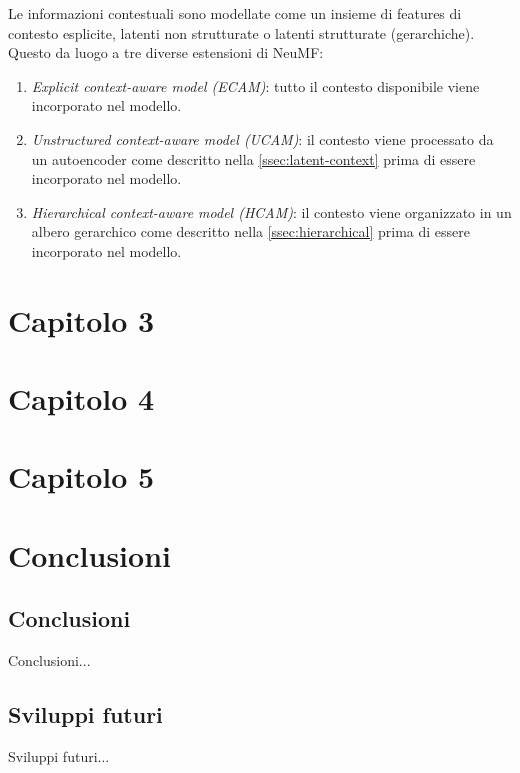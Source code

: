 \documentclass[12pt,italian]{report}
\begin{document}
Le informazioni contestuali sono modellate come un insieme di features di contesto esplicite, latenti non strutturate o latenti strutturate (gerarchiche). Questo da luogo a tre diverse estensioni di NeuMF:
\begin{enumerate}
 \item \textit{Explicit context-aware model (ECAM)}: tutto il contesto disponibile viene incorporato nel modello.
 \item \textit{Unstructured context-aware model (UCAM)}: il contesto viene processato da un autoencoder \cite{latent-context} come descritto nella \autoref{ssec:latent-context} prima di essere incorporato nel modello.
 \item \textit{Hierarchical context-aware model (HCAM)}: il contesto viene organizzato in un albero gerarchico \cite{hierarchical-context} come descritto nella \autoref{ssec:hierarchical} prima di essere incorporato nel modello.
\end{enumerate}

% 
% 

\chapter{Capitolo 3}
\label{chap:classificatore}



% 
% 

\chapter{Capitolo 4}
\label{chap:datasets}


% 
% 

\chapter{Capitolo 5}
\label{chap:risultati}


% 
% 

\chapter{Conclusioni}
\label{cap6}

\section{Conclusioni}

Conclusioni...

\section{Sviluppi futuri}

Sviluppi futuri...



%
%



\end{document}
